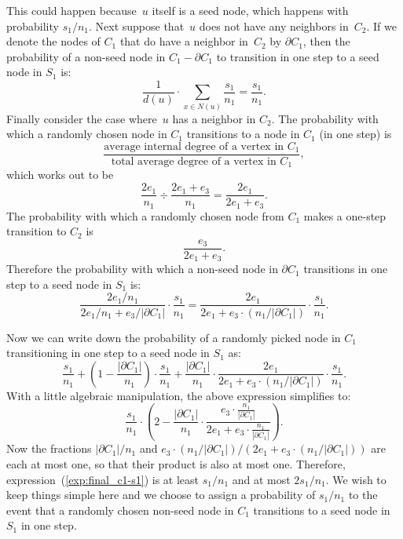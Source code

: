 This could happen because~$u$ itself is a seed node, which happens with probability $s_1 / n_1$.
Next suppose that~$u$ does not have any neighbors in~$C_2$. If we denote the nodes 
of $C_1$ that do have a neighbor in~$C_2$ by $\partial C_1$, then the probability 
of a non-seed node in $C_1 - \partial C_1$ to transition in one step to a seed 
node in $S_1$ is:
\begin{equation}
    \frac{1}{d(u)} \cdot \sum_{x \in N(u)} \frac{s_1}{n_1} = \frac{s_1}{n_1}.
\end{equation}
Finally consider the case where~$u$ has a neighbor in $C_2$. The probability with 
which a randomly chosen node in $C_1$ transitions to a node in $C_1$ (in one step) is 
\[
    \frac{\mbox{average internal degree of a vertex in $C_1$}}
         {\mbox{total average degree of a vertex in $C_1$}},
\]
which works out to be 
\begin{equation}\label{exp:c1-c1}
    \frac{2e_1}{n_1} \div \frac{2e_1 + e_3}{n_1} = \frac{2e_1}{2e_1 + e_3}.
\end{equation}
The probability with which a randomly chosen node from $C_1$ makes a 
one-step transition to $C_2$ is 
\begin{equation}\label{exp:c1-c2}
    \frac{e_3}{2e_1 + e_3}.
\end{equation}
Therefore the probability with which a non-seed node in $\partial C_1$ 
transitions in one step to a seed node in $S_1$ is:
\begin{equation}
    \frac{2e_1 / n_1 }{2e_1 / n_1 + e_3 / |\partial C_1|} \cdot \frac{s_1}{n_1} 
        = \frac{2e_1}{2e_1 + e_3 \cdot (n_1 / |\partial C_1|)} \cdot \frac{s_1}{n_1}.
\end{equation}

Now we can write down the probability of a randomly picked 
node in $C_1$ transitioning in one step to a seed node in $S_1$
as:
\begin{equation}\label{exp:c1-s1}
    \frac{s_1}{n_1} +  \left ( 1 - \frac{|\partial C_1|}{n_1} \right ) \cdot \frac{s_1}{n_1} 
            + \frac{|\partial C_1|}{n_1} 
            \cdot \frac{2e_1}{2e_1 +e_3 \cdot ( n_1 /|\partial C_1 |)} 
            \cdot \frac{s_1}{n_1}.
\end{equation}
With a little algebraic manipulation, the above expression simplifies to: 
\begin{equation}\label{exp:final_c1-s1}
    \frac{s_1}{n_1} \cdot \left ( 2 - \frac{|\partial C_1|}{n_1} 
        \cdot \frac{e_3 \cdot 
        \frac{n_1}{|\partial C_1|}}{2e_1 + e_3 \cdot \frac{n_1}{|\partial C_1|}} \right ).
\end{equation}
Now the fractions $|\partial C_1| / n_1$ and 
$e_3 \cdot (n_1 / |\partial C_1|)/ (2e_1 + e_3 \cdot (n_1 / |\partial C_1|))$ 
are each at most one, so that their product is also at most one. Therefore, 
expression~(\ref{exp:final_c1-s1}) is at least $s_1/ n_1$ and 
at most $2s_1 / n_1$. We wish to keep things simple here and we 
choose to assign a probability of $s_1 / n_1$ to the event that 
a randomly chosen non-seed node in $C_1$ transitions to a seed node
in $S_1$ in one step.

